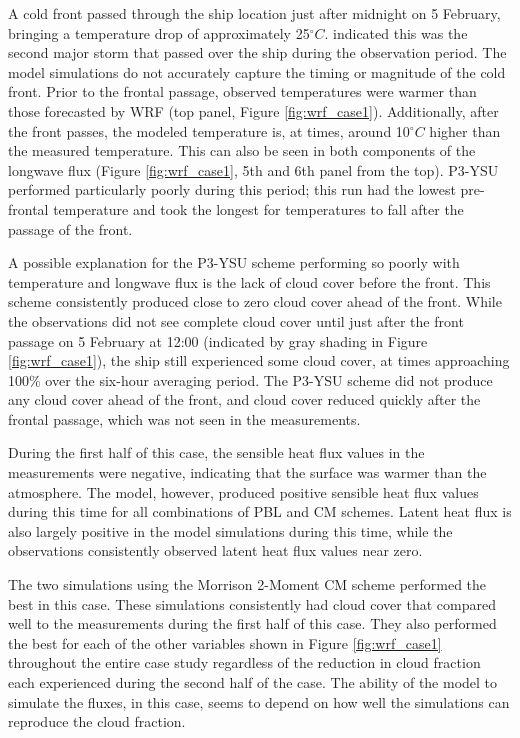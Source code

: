 A cold front passed through the ship location just after midnight on 5 February, bringing a temperature drop of approximately 25$^{\circ}C$. \citet{cohen:2017} indicated this was the second major storm that passed over the ship during the observation period. The model simulations do not accurately capture the timing or magnitude of the cold front. Prior to the frontal passage, observed temperatures were warmer than those forecasted by WRF (top panel, Figure \ref{fig:wrf_case1}). Additionally, after the front passes, the modeled temperature is, at times, around 10$^{\circ}C$ higher than the measured temperature. This can also be seen in both components of the longwave flux (Figure \ref{fig:wrf_case1}, 5th and 6th panel from the top). P3-YSU performed particularly poorly during this period; this run had the lowest pre-frontal temperature and took the longest for temperatures to fall after the passage of the front.

A possible explanation for the P3-YSU scheme performing so poorly with temperature and longwave flux is the lack of cloud cover before the front. This scheme consistently produced close to zero cloud cover ahead of the front. While the observations did not see complete cloud cover until just after the front passage on 5 February at 12:00 (indicated by gray shading in Figure \ref{fig:wrf_case1}), the ship still experienced some cloud cover, at times approaching 100$\%$ over the six-hour averaging period. The P3-YSU scheme did not produce any cloud cover ahead of the front, and cloud cover reduced quickly after the frontal passage, which was not seen in the measurements. 

During the first half of this case, the sensible heat flux values in the measurements were negative, indicating that the surface was warmer than the atmosphere. The model, however, produced positive sensible heat flux values during this time for all combinations of PBL and CM schemes. Latent heat flux is also largely positive in the model simulations during this time, while the observations consistently observed latent heat flux values near zero. 

The two simulations using the Morrison 2-Moment CM scheme performed the best in this case. These simulations consistently had cloud cover that compared well to the measurements during the first half of this case. They also performed the best for each of the other variables shown in Figure \ref{fig:wrf_case1} throughout the entire case study regardless of the reduction in cloud fraction each experienced during the second half of the case. The ability of the model to simulate the fluxes, in this case, seems to depend on how well the simulations can reproduce the cloud fraction.

